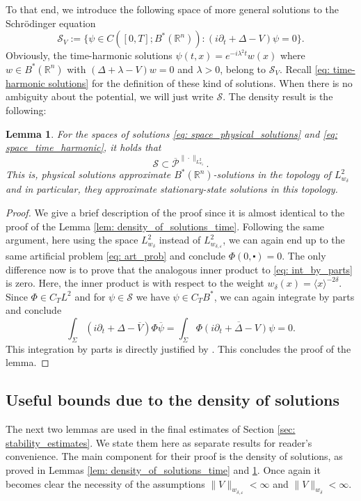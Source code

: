 \documentclass[10pt,a4paper]{amsart}
\newtheorem{lemma}[proposition]{Lemma}
\theoremstyle{remark}
\theoremstyle{definition}
\newcommand{\R}{\mathbb{R}}
\def\ve{\varepsilon}
\def\cal{\mathcal}
\def\ovl{\overline}
\def\cd{\centerdot}
\def\d{\partial}
\begin{document}
To that end, we introduce the following space of more general solutions to the Schr\"odinger equation
%
\begin{equation}\label{eq: space_time_harmonic}
\cal{S}_V := \{ \psi \in C([0, T]; B^*(\R^n)) :  (i\partial_t+\Delta-V) \psi = 0 \}.
\end{equation}
%
Obviously, the time-harmonic solutions $\psi(t,x) = e^{-i\lambda^2t}w(x)$ where $w\in B^*(\R^n)$ with $ (\Delta + \lambda - V)w =0$ and $\lambda>0$, belong to $\cal{S}_V$. Recall \eqref{eq: time-harmonic solutions} for the definition of these kind of solutions. When there is no ambiguity about the potential, we will just write $\cal S$. The density result is the following: 
%
\begin{lemma}\label{lem: density_of_solutions_t_independent}
For the spaces of solutions \eqref{eq: space_physical_solutions} and \eqref{eq: space_time_harmonic}, it holds that 
%
\[
\cal{S} \subset \ovl{\cal{P}}^{\|\cdot\|_{L^2_{w_\delta}}}.
\]
%
This is, physical solutions approximate $B^*(\R^n)$-solutions in the topology of $L^2_{w_\delta}$ and in particular, they approximate stationary-state solutions in this topology.
\end{lemma}
%

\begin{proof}
We give a brief description of the proof since it is almost identical to the proof of the Lemma \ref{lem: density_of_solutions_time}. Following the same argument, here using the space $L^2_{w_\delta}$ instead of $L^2_{w_{\delta, \ve}}$, we can again end up to the same artificial problem \eqref{eq: art_prob} and conclude $\Phi(0, \cd)=0$. The only difference now is to prove that the analogous inner product to \eqref{eq: int_by_parts} is zero. Here, the inner product is with respect to the weight $w_\delta(x) = \langle x \rangle^{-2\delta}$. Since $\Phi \in C_T L^2$ and for $\psi\in \cal S$ we have $\psi\in C_TB^*$, we can again integrate by parts and conclude 
%
\[
\int_\Sigma (i\d_t+\Delta -\ovl{V}) \Phi \ovl{\psi} = \int_\Sigma \Phi \ovl{(i\d_t+\Delta - V) \psi} = 0.
\]
%
This integration by parts is directly justified by \cite[Lemma 3.2]{zbMATH08122191}. This concludes the proof of the lemma. 
\end{proof}

\subsection{Useful bounds due to the density of solutions}
%
The next two lemmas are used in the final estimates of Section \ref{sec: stability_estimates}. We state them here as separate results for reader's convenience. 
The main component for their proof is the density of solutions, as proved in Lemmas \ref{lem: density_of_solutions_time} and \ref{lem: density_of_solutions_t_independent}. Once again it becomes clear the necessity of the assumptions $\| V \|_{w_{\delta, \ve }}< \infty$ and 
$\|V\|_{w_\delta} < \infty$. 
%
\end{document}
